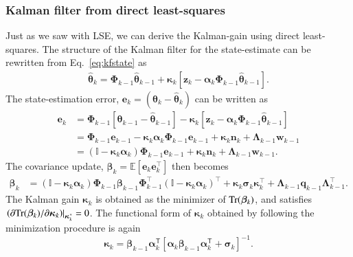\documentclass{resonance}
\def\eb{\mathbf{e}}
\def\th{\bm{\theta}}
\def\thh{\bm{\hat{\theta}}}
\def\n{\bm{n}}
\def\z{\mathbf{z}}
\def\w{\mathbf{w}}
\def\q{\mathbf{q}}
\def\p{\bm{\beta}}
\def\K{\bm{\kappa}}
\def\T{\mathsf{T}}
\def\S{\bm{\sigma}}
\def\H{\bm{\alpha}}
\def\I{\mathbb{I}}
\def\PhiB{\boldsymbol{\Phi}}
\def\LambdaB{\boldsymbol{\Lambda}}
\begin{document}
\subsubsection*{Kalman filter from direct least-squares}
Just as we saw with LSE, we can derive the Kalman-gain using direct least-squares. The structure of the Kalman filter for the state-estimate can be rewritten from Eq.~\ref{eq:kfstate} as
\begin{align*}
    \thh_k = \PhiB_{k-1} \thh_{k-1} + \K_k \left[ \z_k - \H_k \PhiB_{k-1} \thh_{k-1} \right].
\end{align*}
The state-estimation error, $\eb_k = (\th_k - \thh_{k})$ can be written as
\begin{align*}
    \eb_k &= \PhiB_{k-1} \left[ \th_{k-1} - \thh_{k-1} \right]
        - \K_k \left[ \z_k - \H_k \PhiB_{k-1} \thh_{k-1} \right]\\
        &= \PhiB_{k-1} \eb_{k-1} - \K_k \H_k \PhiB_{k-1} \eb_{k-1} + \K_k \n_k + \LambdaB_{k-1} \w_{k-1} \\
        &= \left( \I - \K_k \H_k \right) \PhiB_{k-1} \eb_{k-1} + \K_k \n_k + \LambdaB_{k-1} \w_{k-1}.
\end{align*}
The covariance update, $\p_k = \mathbb{E} \left[ \eb_k \eb_k^\top \right]$ then becomes
\begin{align*}
    \p_k &= \left( \I - \K_k \H_k \right) \PhiB_{k-1} \p_{k-1} \PhiB_{k-1}^\top \left( \I - \K_k \H_k \right)^\top + \K_k \S_k \K_k^\top + \LambdaB_{k-1} \q_{k-1} \LambdaB_{k-1}^\top .
\end{align*}
The Kalman gain $\K_k$ is obtained as the minimizer of ${\rm Tr}(\p_k)$,
and satisfies $\left. \left( \partial {\rm Tr}(\p_k) / \partial \K_k \right) \right|_{\K_k^*}  = 0$. The functional form of $\K_k$ obtained by following the minimization procedure is again
\[
\K_k = \p_{k-1} \H_k^\T [\H_k\p_{k-1} \H_k^\T + \S_k]^{-1}.
\]
\end{document}
